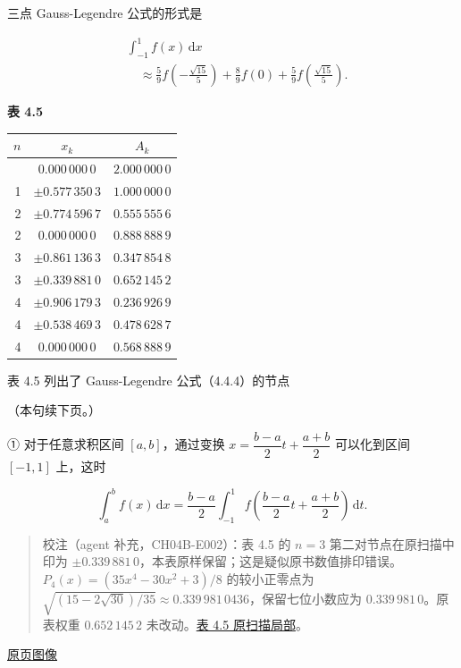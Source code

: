 \documentclass[
  10pt,
  fontset=fandol]{ctexart}
\newcounter{none} %
\begin{document}
三点 Gauss-Legendre 公式的形式是

\[
\begin{aligned}
&\int_{-1}^{1}f(x)\,\mathrm{d}x\\
&\quad\approx\frac59f\left(-\frac{\sqrt{15}}5\right)
+\frac89f(0)+\frac59f\left(\frac{\sqrt{15}}5\right).
\end{aligned}
\]

\textbf{表 4.5}

{\def\LTcaptype{none} %
\begin{longtable}[]{@{}rcc@{}}
\toprule\noalign{}
\(n\) & \(x_k\) & \(A_k\) \\
\midrule\noalign{}
\endhead
\bottomrule\noalign{}
\endlastfoot
0 & \(0.000\,000\,0\) & \(2.000\,000\,0\) \\
1 & \(\pm0.577\,350\,3\) & \(1.000\,000\,0\) \\
2 & \(\pm0.774\,596\,7\) & \(0.555\,555\,6\) \\
2 & \(0.000\,000\,0\) & \(0.888\,888\,9\) \\
3 & \(\pm0.861\,136\,3\) & \(0.347\,854\,8\) \\
3 & \(\pm0.339\,881\,0\) & \(0.652\,145\,2\) \\
4 & \(\pm0.906\,179\,3\) & \(0.236\,926\,9\) \\
4 & \(\pm0.538\,469\,3\) & \(0.478\,628\,7\) \\
4 & \(0.000\,000\,0\) & \(0.568\,888\,9\) \\
\end{longtable}
}

表 4.5 列出了 Gauss-Legendre 公式（4.4.4）的节点

（本句续下页。）

① 对于任意求积区间 \([a,b]\)，通过变换 \(x=\dfrac{b-a}{2}t+\dfrac{a+b}{2}\) 可以化到区间 \([-1,1]\) 上，这时

\[
\int_a^b f(x)\,\mathrm{d}x
=\frac{b-a}{2}\int_{-1}^{1}f\left(\frac{b-a}{2}t+\frac{a+b}{2}\right)\,\mathrm{d}t.
\]

\begin{quote}
校注（agent 补充，CH04B-E002）：表 4.5 的 \(n=3\) 第二对节点在原扫描中印为 \(\pm0.339\,881\,0\)，本表原样保留；这是疑似原书数值排印错误。\(P_4(x)=(35x^4-30x^2+3)/8\) 的较小正零点为 \(\sqrt{(15-2\sqrt{30})/35}\approx0.339\,981\,0436\)，保留七位小数应为 \(0.339\,981\,0\)。原表权重 \(0.652\,145\,2\) 未改动。\href{../assets/ch04b/review-table-4-5.png}{表 4.5 原扫描局部}。
\end{quote}

\href{../../source-images/pdf-109.jpeg}{原页图像}
\end{document}
